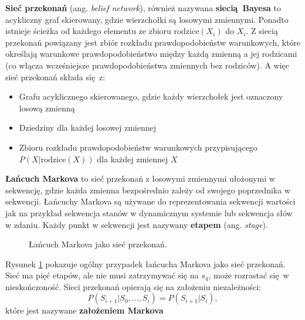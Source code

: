 \documentclass[a4paper, 12pt,oneside]{book}
\begin{document}
\textbf{Sieć przekonań} (ang. \textit{belief network}), również nazywana
\textbf{siecią Bayesa} to acykliczny graf skierowany, gdzie wierzchołki są
losowymi zmiennymi. Ponadto istnieje ścieżka od każdego elementu ze zbioru
$\text{rodzice}(X_i)$ do $X_i$. Z siecią przekonań powiązany jest zbiór
rozkładu prawdopodobieństw warunkowych, które określają warunkowe
prawdopodobieństwo między każdą zmienną a jej rodzicami (co włącza wcześniejsze
prawdopodobieństwa zmiennych bez rodziców). A więc sieć przekonań składa się z:
\begin{itemize}
	\setlength\itemsep{-0.4em}
\item Grafu acyklicznego skierowanego, gdzie każdy wierzchołek jest oznaczony
	losową zmienną
\item Dziedziny dla każdej losowej zmiennej
\item Zbioru rozkładu prawdopodobieństw warunkowych przypisującego
	$P(X|\text{rodzice}(X))$ dla każdej zmiennej $X$
\end{itemize}

\textbf{Łańcuch Markova} to sieć przekonań z losowymi zmiennymi ułożonymi w
sekwencję, gdzie każda zmienna bezpośrednio zależy od swojego poprzednika w
sekwencji. Łańcuchy Markova są używane do reprezentowania sekwencji wartości
jak na przykład sekwencja stanów w dynamicznym systemie lub sekwencja słów w
zdaniu. Każdy punkt w sekwencji jest nazywany \textbf{etapem} (ang.
\textit{stage}).
\begin{figure}[!htb]
\begin{center}
\caption{Łańcuch Markova jako sieć przekonań.}
\label{markov_chain}
\end{center}
\end{figure}
Rysunek \ref{markov_chain} pokazuje ogólny przypadek łańcucha Markova jako sieć
przekonań. Sieć ma pięć etapów, ale nie musi zatrzymywać się na $s_4$, może
rozrastać się w nieskończoność. Sieci przekonań opierają się na założeniu
niezależności: \[P(S_{i+1} | S_0, \dots , S_i) = P(S_{i+1} | S_i),\]
które jest nazywane \textbf{założeniem Markova}
\end{document}
